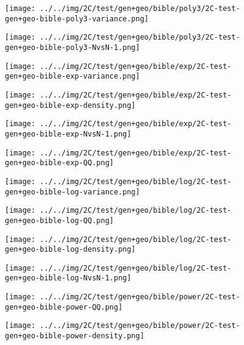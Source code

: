 \begin{figure}[H]
\centering	\texttt{[image: ../../img/2C/test/gen+geo/bible/poly3/2C-test-gen+geo-bible-poly3-variance.png]}
\end{figure}
\begin{figure}[H]
\centering	\texttt{[image: ../../img/2C/test/gen+geo/bible/poly3/2C-test-gen+geo-bible-poly3-NvsN-1.png]}
\end{figure}
\begin{figure}[H]
\centering	\texttt{[image: ../../img/2C/test/gen+geo/bible/exp/2C-test-gen+geo-bible-exp-variance.png]}
\end{figure}
\begin{figure}[H]
\centering	\texttt{[image: ../../img/2C/test/gen+geo/bible/exp/2C-test-gen+geo-bible-exp-density.png]}
\end{figure}
\begin{figure}[H]
\centering	\texttt{[image: ../../img/2C/test/gen+geo/bible/exp/2C-test-gen+geo-bible-exp-NvsN-1.png]}
\end{figure}
\begin{figure}[H]
\centering	\texttt{[image: ../../img/2C/test/gen+geo/bible/exp/2C-test-gen+geo-bible-exp-QQ.png]}
\end{figure}
\begin{figure}[H]
\centering	\texttt{[image: ../../img/2C/test/gen+geo/bible/log/2C-test-gen+geo-bible-log-variance.png]}
\end{figure}
\begin{figure}[H]
\centering	\texttt{[image: ../../img/2C/test/gen+geo/bible/log/2C-test-gen+geo-bible-log-QQ.png]}
\end{figure}
\begin{figure}[H]
\centering	\texttt{[image: ../../img/2C/test/gen+geo/bible/log/2C-test-gen+geo-bible-log-density.png]}
\end{figure}
\begin{figure}[H]
\centering	\texttt{[image: ../../img/2C/test/gen+geo/bible/log/2C-test-gen+geo-bible-log-NvsN-1.png]}
\end{figure}
\begin{figure}[H]
\centering	\texttt{[image: ../../img/2C/test/gen+geo/bible/power/2C-test-gen+geo-bible-power-QQ.png]}
\end{figure}
\begin{figure}[H]
\centering	\texttt{[image: ../../img/2C/test/gen+geo/bible/power/2C-test-gen+geo-bible-power-density.png]}
\end{figure}
